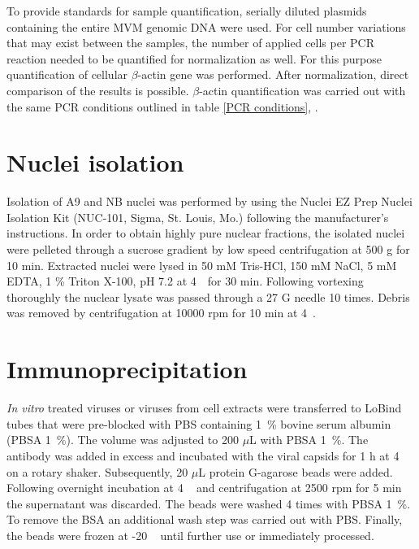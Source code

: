 To provide standards for sample quantification, serially diluted plasmids containing the entire MVM genomic DNA were used.
For cell number variations that may exist between the samples, the number of applied cells per PCR reaction needed to be quantified for normalization as well. For this purpose quantification of cellular $\beta$-actin gene was performed. After normalization, direct comparison of the results is possible. $\beta$-actin quantification was carried out with the same PCR conditions outlined in table \ref{PCR conditions}, \pageref{PCR conditions}.


\section{Nuclei isolation}
Isolation of A9 and NB nuclei was performed by using the Nuclei EZ Prep Nuclei Isolation Kit (NUC-101, Sigma, St. Louis, Mo.) following the manufacturer’s instructions. In order to obtain highly pure nuclear fractions, the isolated nuclei were pelleted through a sucrose gradient by low speed centrifugation at 500 g for 10 min. Extracted nuclei were lysed in 50 mM Tris-HCl, 150 mM NaCl, 5 mM EDTA, 1 \% Triton X-100, pH 7.2 at 4~\textcelsius~for 30 min. Following vortexing thoroughly the nuclear lysate was passed through a 27 G needle 10 times. Debris was removed by centrifugation at 10000 rpm for 10 min at 4~\textcelsius.      



\section{Immunoprecipitation}
\textit{In vitro} treated viruses or viruses from cell extracts were transferred to LoBind tubes that were pre-blocked with PBS containing 1~\% bovine serum albumin (PBSA 1~\%). The volume was adjusted to 200 $\mu$L with PBSA 1~\%. The antibody was added in excess and incubated with the viral capsids for 1 h at 4 \textcelsius~ on a rotary shaker. Subsequently, 20 $\mu$L protein G-agarose beads were added. Following overnight incubation at 4 \textcelsius~ and centrifugation at 2500 rpm for 5 min the supernatant was discarded. The beads were washed 4 times with PBSA 1~\%. To remove the BSA an additional wash step was carried out with PBS. Finally, the beads were frozen at -20 \textcelsius~ until further use or immediately processed. 


